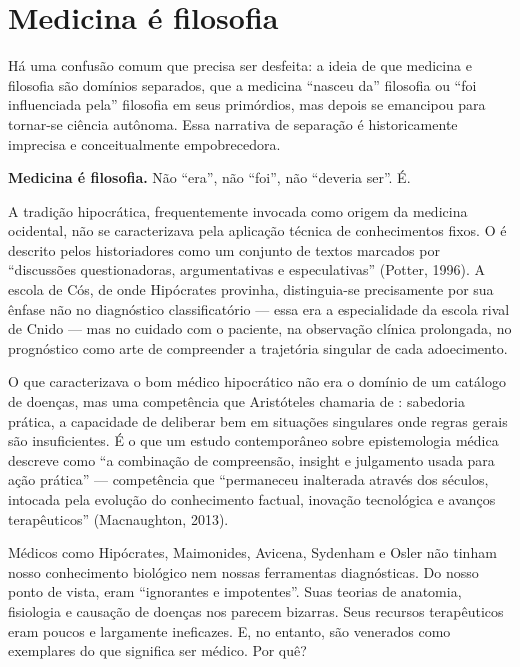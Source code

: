 \section{Medicina é filosofia}
\label{sec:medicina-filosofia}

Há uma confusão comum que precisa ser desfeita: a ideia de que medicina e filosofia são domínios separados, que a medicina \enquote{nasceu da} filosofia ou \enquote{foi influenciada pela} filosofia em seus primórdios, mas depois se emancipou para tornar-se ciência autônoma. Essa narrativa de separação é historicamente imprecisa e conceitualmente empobrecedora.

\textbf{Medicina é filosofia.} Não \enquote{era}, não \enquote{foi}, não \enquote{deveria ser}. É.

A tradição hipocrática, frequentemente invocada como origem da medicina ocidental, não se caracterizava pela aplicação técnica de conhecimentos fixos. O  é descrito pelos historiadores como um conjunto de textos marcados por \enquote{discussões questionadoras, argumentativas e especulativas} (Potter, 1996). A escola de Cós, de onde Hipócrates provinha, distinguia-se precisamente por sua ênfase não no diagnóstico classificatório --- essa era a especialidade da escola rival de Cnido --- mas no cuidado com o paciente, na observação clínica prolongada, no prognóstico como arte de compreender a trajetória singular de cada adoecimento.

O que caracterizava o bom médico hipocrático não era o domínio de um catálogo de doenças, mas uma competência que Aristóteles chamaria de : sabedoria prática, a capacidade de deliberar bem em situações singulares onde regras gerais são insuficientes. É o que um estudo contemporâneo sobre epistemologia médica descreve como \enquote{a combinação de compreensão, insight e julgamento usada para ação prática} --- competência que \enquote{permaneceu inalterada através dos séculos, intocada pela evolução do conhecimento factual, inovação tecnológica e avanços terapêuticos} (Macnaughton, 2013).

Médicos como Hipócrates, Maimonides, Avicena, Sydenham e Osler não tinham nosso conhecimento biológico nem nossas ferramentas diagnósticas. Do nosso ponto de vista, eram \enquote{ignorantes e impotentes}. Suas teorias de anatomia, fisiologia e causação de doenças nos parecem bizarras. Seus recursos terapêuticos eram poucos e largamente ineficazes. E, no entanto, são venerados como exemplares do que significa ser médico. Por quê?

